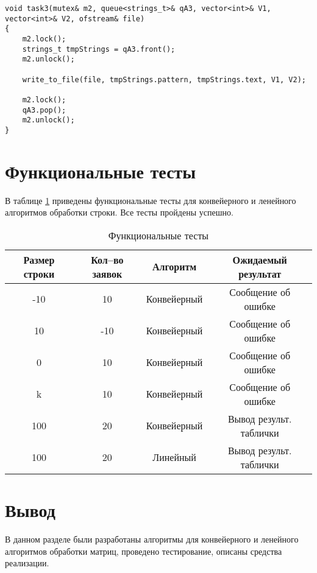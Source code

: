 \clearpage

\begin{center}
\captionsetup{justification=raggedright,singlelinecheck=off}
\begin{lstlisting}[label=lst:stage_3,caption=Функция реализации 3-его этапа обработки строки]
void task3(mutex& m2, queue<strings_t>& qA3, vector<int>& V1, vector<int>& V2, ofstream& file)
{
	m2.lock();
	strings_t tmpStrings = qA3.front();
	m2.unlock();
	
	write_to_file(file, tmpStrings.pattern, tmpStrings.text, V1, V2);
	
	m2.lock();
	qA3.pop();
	m2.unlock();
}
\end{lstlisting}
\end{center}

\section{Функциональные тесты}

В таблице \ref{tbl:functional_test} приведены функциональные тесты для конвейерного и ленейного алгоритмов обработки строки. Все тесты пройдены успешно.

\begin{table}[h]
	\begin{center}
	\begin{threeparttable}
		\captionsetup{justification=raggedright,singlelinecheck=off}
		\caption{\label{tbl:functional_test} Функциональные тесты}
		\begin{tabular}{|c|c|c|c|}
			\hline
			 Размер строки & Кол--во заявок & Алгоритм & Ожидаемый результат 
			\\ \hline
			-10 & 10 & Конвейерный & Сообщение об ошибке 
			\\ \hline
			 10 & -10 & Конвейерный & Сообщение об ошибке 
			\\ \hline
			 0 & 10 & Конвейерный & Сообщение об ошибке 
			\\ \hline
			 k & 10 & Конвейерный & Сообщение об ошибке 
			\\ \hline
			 100 & 20 & Конвейерный & Вывод результ. таблички
			\\ \hline
			 100 & 20 & Линейный & Вывод результ. таблички
			\\ \hline
		\end{tabular}
	\end{threeparttable}
	\end{center}
\end{table}

\section*{Вывод}

В данном разделе были разработаны алгоритмы для конвейерного и ленейного алгоритмов обработки матриц, проведено тестирование, описаны средства реализации.

